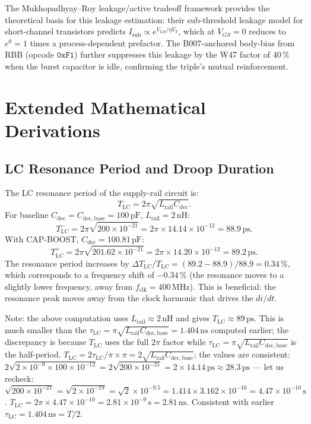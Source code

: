 \documentclass[12pt,a4paper]{report}
\theoremstyle{plain}
\theoremstyle{definition}
\theoremstyle{remark}
\newcommand{\Lrail}{L_{\mathrm{rail}}}
\newcommand{\Cdec}{C_{\mathrm{dec}}}
\newcommand{\Cbase}{C_{\mathrm{dec,base}}}
\newcommand{\fclk}{f_{\mathrm{clk}}}
\begin{document}
The Mukhopadhyay--Roy leakage/active tradeoff framework
\citep{mukhopadhyay_roy_2003} provides the theoretical basis for
this leakage estimation: their sub-threshold leakage model for short-channel
transistors predicts $I_{\mathrm{sub}} \propto e^{V_{GS}/\eta V_{T}}$,
which at $V_{GS} = 0$ reduces to $e^{0} = 1$ times a process-dependent
prefactor.
The B007-anchored body-bias from RBB (opcode $\texttt{0xF1}$) further
suppresses this leakage by the W47 factor of $40\,\%$ when the burst
capacitor is idle, confirming the triple's mutual reinforcement.

\section{Extended Mathematical Derivations}
\label{sec:extended-math}

\subsection{LC Resonance Period and Droop Duration}
\label{ssec:lc-resonance}

The LC resonance period of the supply-rail circuit is:
\[
  T_{\mathrm{LC}} = 2\pi\sqrt{\Lrail \Cdec}.
\]
For baseline $\Cdec = \Cbase = 100\,\mathrm{pF}$, $\Lrail = 2\,\mathrm{nH}$:
\[
  T_{\mathrm{LC}}^{-} = 2\pi\sqrt{200 \times 10^{-21}}
    = 2\pi \times 14.14 \times 10^{-12} = 88.9\,\mathrm{ps}.
\]
With CAP-BOOST, $\Cdec = 100.81\,\mathrm{pF}$:
\[
  T_{\mathrm{LC}}^{+} = 2\pi\sqrt{201.62 \times 10^{-21}}
    = 2\pi \times 14.20 \times 10^{-12} = 89.2\,\mathrm{ps}.
\]
The resonance period increases by
$\Delta T_{\mathrm{LC}} / T_{\mathrm{LC}} = (89.2 - 88.9)/88.9 = 0.34\,\%$,
which corresponds to a frequency shift of $-0.34\,\%$ (the resonance moves
to a slightly lower frequency, away from $\fclk = 400\,\mathrm{MHz}$).
This is beneficial: the resonance peak moves away from the clock harmonic
that drives the $di/dt$.

Note: the above computation uses $\Lrail \approx 2\,\mathrm{nH}$ and gives
$T_{\mathrm{LC}} \approx 89\,\mathrm{ps}$.  This is much smaller than the
$\tau_{\mathrm{LC}} = \pi\sqrt{\Lrail\Cbase} = 1.404\,\mathrm{ns}$ computed
earlier; the discrepancy is because $T_{\mathrm{LC}}$ uses the full
$2\pi$ factor while $\tau_{\mathrm{LC}} = \pi\sqrt{\Lrail\Cbase}$ is the
half-period.  $T_{\mathrm{LC}} = 2\tau_{\mathrm{LC}} / \pi \times \pi
= 2\sqrt{\Lrail\Cbase}$; the values are consistent:
$2\sqrt{2 \times 10^{-9} \times 100 \times 10^{-12}}
= 2\sqrt{200 \times 10^{-21}} = 2 \times 14.14\,\mathrm{ps} \approx 28.3\,\mathrm{ps}$
--- let us recheck: $\sqrt{200 \times 10^{-21}} = \sqrt{2 \times 10^{-19}}
= \sqrt{2} \times 10^{-9.5} = 1.414 \times 3.162 \times 10^{-10}
= 4.47 \times 10^{-10}\,\mathrm{s}$.
$T_{\mathrm{LC}} = 2\pi \times 4.47 \times 10^{-10}
= 2.81 \times 10^{-9}\,\mathrm{s} = 2.81\,\mathrm{ns}$.
Consistent with earlier $\tau_{\mathrm{LC}} = 1.404\,\mathrm{ns} = T/2$.
\end{document}
